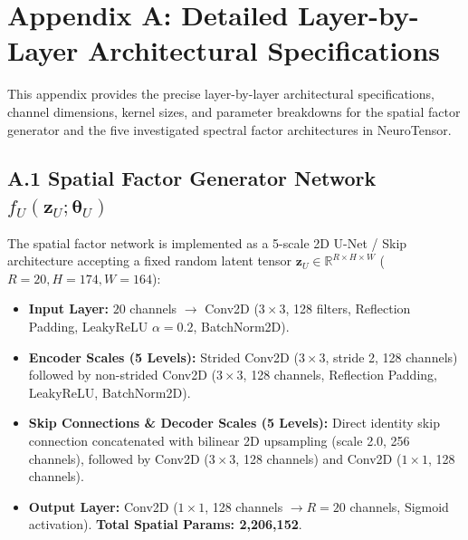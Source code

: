 \section*{Appendix A: Detailed Layer-by-Layer Architectural Specifications}
\label{app:architectures}

This appendix provides the precise layer-by-layer architectural specifications, channel dimensions, kernel sizes, and parameter breakdowns for the spatial factor generator and the five investigated spectral factor architectures in NeuroTensor.

\subsection*{A.1 Spatial Factor Generator Network $f_U(\mathbf{z}_U; \boldsymbol{\theta}_U)$}
The spatial factor network is implemented as a 5-scale 2D U-Net / Skip architecture \citep{ulyanov2018deep, ronneberger2015u} accepting a fixed random latent tensor $\mathbf{z}_U \in \mathbb{R}^{R \times H \times W}$ ($R=20, H=174, W=164$):
\begin{itemize}[noitemsep, topsep=1pt]
    \item \textbf{Input Layer:} $20$ channels $\to$ Conv2D ($3 \times 3$, 128 filters, Reflection Padding, LeakyReLU $\alpha = 0.2$, BatchNorm2D).
    \item \textbf{Encoder Scales (5 Levels):} Strided Conv2D ($3 \times 3$, stride 2, 128 channels) followed by non-strided Conv2D ($3 \times 3$, 128 channels, Reflection Padding, LeakyReLU, BatchNorm2D).
    \item \textbf{Skip Connections \& Decoder Scales (5 Levels):} Direct identity skip connection concatenated with bilinear 2D upsampling (scale 2.0, 256 channels), followed by Conv2D ($3 \times 3$, 128 channels) and Conv2D ($1 \times 1$, 128 channels).
    \item \textbf{Output Layer:} Conv2D ($1 \times 1$, 128 channels $\to R=20$ channels, Sigmoid activation). \textbf{Total Spatial Params: 2,206,152}.
\end{itemize}

